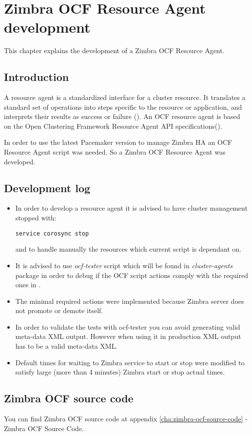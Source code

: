 

\chapter{Zimbra OCF Resource Agent development}
\label{chap:zimbra-ocf}
This chapter explains the development of a Zimbra OCF Resource Agent.

\section {Introduction}
A resource agent is a standardized interface for a cluster resource. It translates a standard set of operations into steps specific to the resource or application, and interprets their results as success or failure (\cite{ResourceAgentsWiki}). An OCF resource agent is based on the Open Clustering Framework Resource Agent API specifications(\cite{OCFResourceAgentsWiki}).

In order to use the latest Pacemaker version to manage Zimbra HA an OCF Resource Agent script was needed. So a Zimbra OCF Resource Agent was developed.

\section {Development log}
\begin{itemize}
  \item {In order to develop a resource agent it is advised to have cluster management stopped with:
\begin{verbatim}
service corosync stop
\end{verbatim}
and to handle manually the resources which current script is dependant on.
  }
  \item {It is advised to use \textit{ocf-tester} script which will be found in \textit{cluster-agents} package in order to debug if the OCF script actions comply with the required ones in \cite{OCFResourceAgentsWiki}.
  }
  \item {The minimal required actions were implemented because Zimbra server does not promote or demote itself.
  }
  \item {In order to validate the tests with ocf-tester you can avoid generating valid meta-data XML output. However when using it in production XML output has to be a valid meta-data XML. 
  }
  \item {Default times for waiting to Zimbra service to start or stop were modified to satisfy large (more than 4 minutes) Zimbra start or stop actual times.
  }
\end{itemize}

\section {Zimbra OCF source code}

You can find Zimbra OCF source code at appendix {\ref{cha:zimbra-ocf-source-code} - Zimbra OCF Source Code}.



